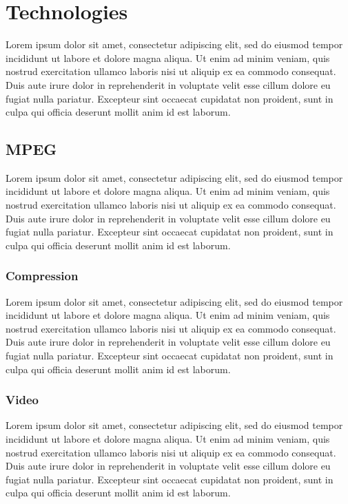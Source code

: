 %
%
\chapter{Technologies}

Lorem ipsum dolor sit amet, consectetur adipiscing elit, sed do eiusmod tempor incididunt ut labore et dolore magna aliqua. Ut enim ad minim veniam, quis nostrud exercitation ullamco laboris nisi ut aliquip ex ea commodo consequat. Duis aute irure dolor in reprehenderit in voluptate velit esse cillum dolore eu fugiat nulla pariatur. Excepteur sint occaecat cupidatat non proident, sunt in culpa qui officia deserunt mollit anim id est laborum.

\section{MPEG}
Lorem ipsum dolor sit amet, consectetur adipiscing elit, sed do eiusmod tempor incididunt ut labore et dolore magna aliqua. Ut enim ad minim veniam, quis nostrud exercitation ullamco laboris nisi ut aliquip ex ea commodo consequat. Duis aute irure dolor in reprehenderit in voluptate velit esse cillum dolore eu fugiat nulla pariatur. Excepteur sint occaecat cupidatat non proident, sunt in culpa qui officia deserunt mollit anim id est laborum.

\subsection{Compression}
Lorem ipsum dolor sit amet, consectetur adipiscing elit, sed do eiusmod tempor incididunt ut labore et dolore magna aliqua. Ut enim ad minim veniam, quis nostrud exercitation ullamco laboris nisi ut aliquip ex ea commodo consequat. Duis aute irure dolor in reprehenderit in voluptate velit esse cillum dolore eu fugiat nulla pariatur. Excepteur sint occaecat cupidatat non proident, sunt in culpa qui officia deserunt mollit anim id est laborum.

\subsection{Video}
Lorem ipsum dolor sit amet, consectetur adipiscing elit, sed do eiusmod tempor incididunt ut labore et dolore magna aliqua. Ut enim ad minim veniam, quis nostrud exercitation ullamco laboris nisi ut aliquip ex ea commodo consequat. Duis aute irure dolor in reprehenderit in voluptate velit esse cillum dolore eu fugiat nulla pariatur. Excepteur sint occaecat cupidatat non proident, sunt in culpa qui officia deserunt mollit anim id est laborum.

